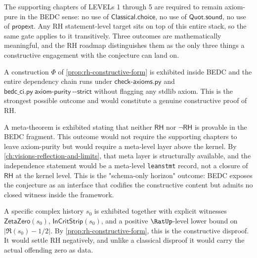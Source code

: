 The supporting chapters of LEVELs 1 through 5 are required to remain axiom-pure in the BEDC sense: no use of $\mathsf{Classical.choice}$, no use of $\mathsf{Quot.sound}$, no use of $\mathsf{propext}$. Any RH statement-level target sits on top of this entire stack, so the same gate applies to it transitively. Three outcomes are mathematically meaningful, and the RH roadmap distinguishes them as the only three things a constructive engagement with the conjecture can land on.

\begin{remark}
\label{rem:rh-outcome-provable}
A construction $\Phi$ of \autoref{prop:rh-constructive-form} is exhibited inside BEDC and the entire dependency chain runs under $\mathsf{check\text{-}axioms.py}$ and $\mathsf{bedc\_ci.py\ axiom\text{-}purity\ \text{-}\text{-}strict}$ without flagging any stdlib axiom. This is the strongest possible outcome and would constitute a genuine constructive proof of RH.
\end{remark}

\begin{remark}
\label{rem:rh-outcome-independence}
A meta-theorem is exhibited stating that neither $\mathsf{RH}$ nor $\neg\mathsf{RH}$ is provable in the BEDC fragment. This outcome would not require the supporting chapters to leave axiom-purity but would require a meta-level layer above the kernel. By \autoref{ch:visions-reflection-and-limits}, that meta layer is structurally available, and the independence statement would be a meta-level \texttt{leanstmt} record, not a closure of $\mathsf{RH}$ at the kernel level. This is the "schema-only horizon" outcome: BEDC exposes the conjecture as an interface that codifies the constructive content but admits no closed witness inside the framework.
\end{remark}

\begin{remark}
\label{rem:rh-outcome-counterexample}
A specific complex history $s_0$ is exhibited together with explicit witnesses $\mathsf{ZetaZero}(s_0)$, $\mathsf{InCritStrip}(s_0)$, and a positive $\RatUp$-level lower bound on $|\Re(s_0) - 1/2|$. By \autoref{prop:rh-constructive-form}, this is the constructive disproof. It would settle RH negatively, and unlike a classical disproof it would carry the actual offending zero as data.
\end{remark}

